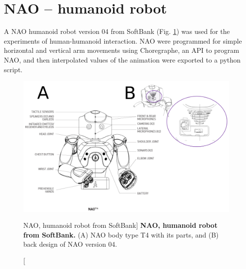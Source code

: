 \newpage
\section{NAO -- humanoid robot}  \label{appendix:nao}
A NAO humanoid robot version 04 from SoftBank (Fig. \ref{fig:nao})
was used for the experiments of human-humanoid interaction. 
NAO were programmed for simple horizontal and vertical arm movements
using Choregraphe, an API to program NAO, and then 
interpolated values of the animation were exported 
to a python script.
\begin{figure}[h]
 \centering
   \includegraphics[width=1.0\textwidth]{nao}
   \caption
	[NAO, humanoid robot from SoftBank]{
	{\bf NAO, humanoid robot from SoftBank.}
		(A) NAO body type T4 with its parts, and 
		(B) back design of NAO version 04.
}
   \label{fig:nao}
\end{figure}

